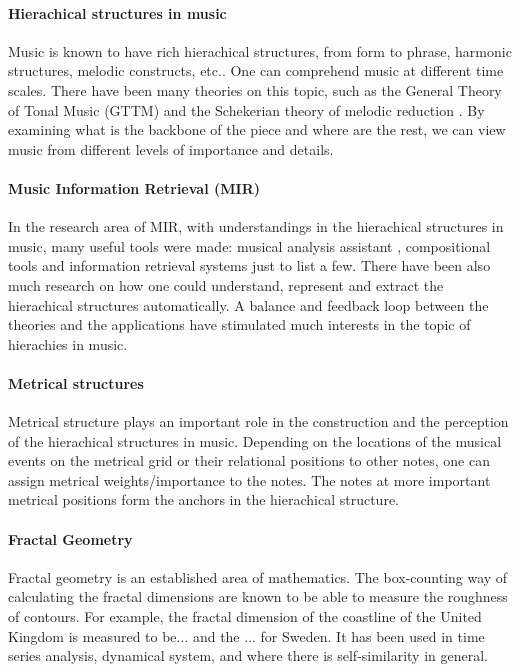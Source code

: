 \documentclass[acmsmall,review,anonymous]{acmart}\settopmatter{printfolios=true,printccs=false,printacmref=false}
\begin{document}

\paragraph{Hierachical structures in music}
Music is known to have rich hierachical structures, from form to phrase,
harmonic structures, melodic constructs, etc.. One can comprehend music at
different time scales. There have been many theories on this topic, such as the
General Theory of Tonal Music (GTTM) \cite{} and the Schekerian theory of melodic reduction
\cite{}. By examining what is the backbone of the piece and where
are the rest, we can view music from different levels of importance and details.

\paragraph{Music Information Retrieval (MIR)}
In the research area of MIR, with understandings in the hierachical structures in music, many
useful tools were made: musical analysis assistant \cite{}, compositional tools
\cite{} and information retrieval systems \cite{} just to list a few.
There have been also much research on how one could understand, represent and extract the
hierachical structures automatically. A balance and feedback loop between the theories and the
applications have stimulated much interests in the topic of hierachies in music. 

\paragraph{Metrical structures}
Metrical structure plays an important role in the construction and the
perception of the hierachical structures in music. Depending on the locations of
the musical events on the metrical grid or their relational positions to other
notes, one can assign metrical weights/importance to the notes. The notes at more important metrical
positions form the anchors in the hierachical structure. 

\paragraph{Fractal Geometry}
Fractal geometry is an established area of mathematics. The box-counting way of
calculating the fractal dimensions are known to be able to measure the roughness
of contours. For example, the fractal dimension of the coastline of the United
Kingdom is measured to be... and the ... for Sweden. It has been used in time
series analysis, dynamical system, and where there is self-similarity in
general. 
\end{document}
